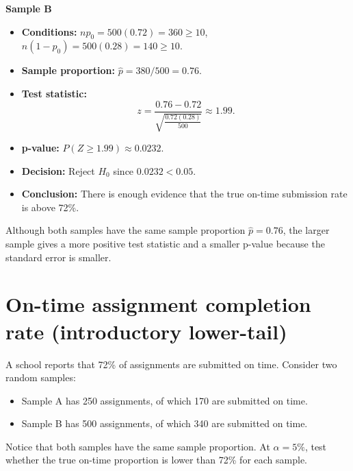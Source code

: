 	\begin{center}
	\end{center}
		

	
	\textbf{Sample B}
	
	\begin{itemize}
	\item \textbf{Conditions:} \(np_0=500(0.72)=360\ge10\), \(n(1-p_0)=500(0.28)=140\ge10\).
	\item \textbf{Sample proportion:} \(\hat p=380/500=0.76\).
		\item \textbf{Test statistic:}
		\[
	z=\frac{0.76-0.72}{\sqrt{\frac{0.72(0.28)}{500}}}\approx 1.99.
	\]
	\item \textbf{p-value:} \(P(Z\ge 1.99)\approx 0.0232\).
	\item \textbf{Decision:} Reject \(H_0\) since \(0.0232<0.05\).
	\item \textbf{Conclusion:} There is enough evidence that the true on-time submission rate is above 72\%.
		\end{itemize}
		
	\begin{center}
	\end{center}
	

		
	Although both samples have the same sample proportion \(\hat p=0.76\), the larger sample gives a more positive test statistic and a smaller p-value because the standard error is smaller.
		
\section{On-time assignment completion rate (introductory lower-tail)}
A school reports that 72\% of assignments are submitted on time. Consider two random samples:
\begin{itemize}
	\item Sample A has 250 assignments, of which 170 are submitted on time.
	\item Sample B has 500 assignments, of which 340 are submitted on time.
\end{itemize}
Notice that both samples have the same sample proportion. At \(\alpha=5\%\), test whether the true on-time proportion is lower than 72\% for each sample.

